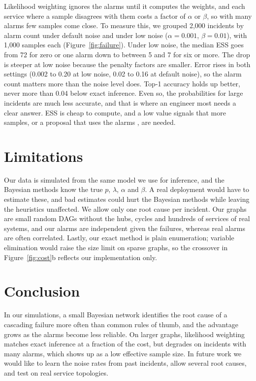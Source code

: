 \documentclass{article}
\begin{document}
Likelihood weighting ignores the alarms until it computes the weights, and
each service where a sample disagrees with them costs a factor of $\alpha$ or
$\beta$, so with many alarms few samples come close. To measure this, we grouped 2,000
incidents by alarm count under default noise and under low noise
($\alpha = 0.001$, $\beta = 0.01$), with 1,000 samples each
(Figure~\ref{fig:failure}). Under low noise, the median ESS goes from 72 for
zero or one alarm down to between 5 and 7 for six or more. The drop is steeper
at low noise because the penalty factors are smaller. Error rises in both
settings (0.002 to 0.20 at low noise, 0.02 to 0.16 at default noise), so the
alarm count matters more than the noise level does. Top-1 accuracy holds up
better, never more than 0.04 below exact inference. Even so, the probabilities
for large incidents are much less accurate, and that is where an engineer most
needs a clear answer. ESS is cheap to compute, and a low value
signals that more samples, or a proposal that uses the alarms
\citep{cheng2000aisbn}, are needed.

\section{Limitations}

Our data is simulated from the same model we use for inference, and the
Bayesian methods know the true $p$, $\lambda$, $\alpha$ and $\beta$. A real
deployment would have to estimate these, and bad estimates could hurt the
Bayesian methods while leaving the heuristics unaffected. We allow only one
root cause per incident. Our graphs are small random DAGs without the hubs,
cycles and hundreds of services of real systems, and our alarms are
independent given the failures, whereas real alarms are often correlated.
Lastly, our exact method is plain enumeration; variable elimination would
raise the size limit on sparse graphs, so the crossover in
Figure~\ref{fig:cost}b reflects our implementation only.

\section{Conclusion}

In our simulations, a small Bayesian network identifies the root cause of a
cascading failure more often than common rules of thumb, and the advantage
grows as the alarms become less reliable. On larger graphs, likelihood
weighting matches exact inference at a fraction of the cost, but degrades on
incidents with many alarms, which shows up as a low effective sample size. In
future work we would like to learn the noise rates from past incidents, allow
several root causes, and test on real service topologies.



\end{document}
